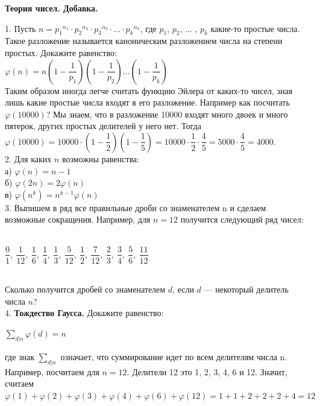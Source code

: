 \centerline{\bf \Huge Теория чисел. Добавка.} 

1. Пусть $n = {p_1}^{\alpha_1}\cdot{p_2}^{\alpha_2}\cdot{p_3}^{\alpha_3}\cdot\dotsc\cdot{p_k}^{\alpha_k}$, где $p_1$, $p_2$, ... , $p_k$ какие-то простые числа. Такое разложение называется каноническим разложением числа на степени простых. Докажите равенство:\\
$\varphi(n) = n(1 - \dfrac{1}{p_1})(1 - \dfrac{1}{p_2})\dots(1 - \dfrac{1}{p_k})$\\

Таким образом иногда легче считать функцию Эйлера от каких-то чисел, зная лишь какие простые числа входят в его разложение. Например как посчитать $\varphi(10000)$? Мы знаем, что в разложение 10000 входят много двоек и много пятерок, других простых делителей у него нет. Тогда $\varphi(10000) = 10000\cdot(1 - \dfrac{1}{2})(1 - \dfrac{1}{5}) = 10000\cdot \dfrac{1}{2} \cdot \dfrac{4}{5} = 5000 \cdot \dfrac{4}{5} = 4000$. \\

2. Для каких $n$ возможны равенства:\\
а) $\varphi(n) = n - 1$ \\ 
б) $\varphi(2n) = 2\varphi(n)$ \\ 
в) $\varphi(n^k) = n^{k-1}\varphi(n)$\\

3. Выпишем в ряд все правильные дроби со знаменателем n и сделаем возможные сокращения. Например, для $n = 12$ получится следующий ряд чисел: \\ \\
\centerline{$\dfrac{0}{1}, \ \dfrac{1}{12}, \ \dfrac{1}{6}, \
            \dfrac{1}{4}, \ \dfrac{1}{3}, \ \dfrac{5}{12}, \
            \dfrac{1}{2}, \ \dfrac{7}{12}, \ \dfrac{2}{3}, \
            \dfrac{3}{4}, \ \dfrac{5}{6}, \ \dfrac{11}{12}$} \\ 
            
Сколько получится дробей со знаменателем $d$, если $d$ — некоторый делитель числа $n$? \\ 

4. \textbf{Тождество Гаусса.} Докажите равенство: \\ 

\centerline{\larger$\sum\limits_{d|n}\varphi(d) = n$}
где знак $\sum\limits_{d|n}$ означает, что суммирование идет по всем делителям числа n. Например, посчитаем для $n = 12$. Делители 12 это 1, 2, 3, 4, 6 и 12. Значит, считаем $\varphi(1)+\varphi(2)+\varphi(3)+\varphi(4)+\varphi(6)+\varphi(12) = 1+1+2+2+2+4=12$
